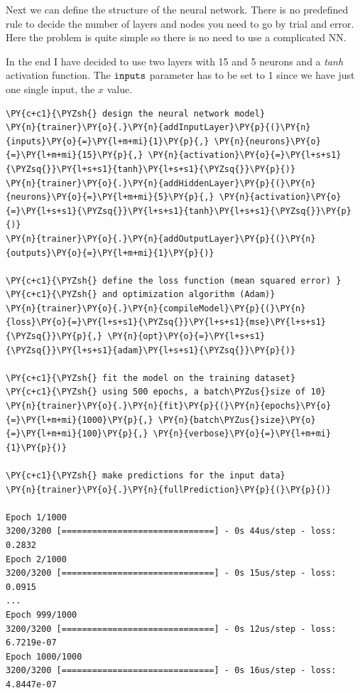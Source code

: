Next we can define the structure of the neural network. There is no
predefined rule to decide the number of layers and nodes you need to go
by trial and error. Here the problem is quite simple so there is no need
to use a complicated NN.

In the end I have decided to use two layers with 15 and 5 neurons and a
\emph{tanh} activation function. The \(\tt{inputs}\) parameter has to be
set to 1 since we have just one single input, the \(x\) value.

\begin{tcolorbox}[breakable, size=fbox, boxrule=1pt, pad at break*=1mm,colback=cellbackground, colframe=cellborder]
\begin{Verbatim}[commandchars=\\\{\}]
\PY{c+c1}{\PYZsh{} design the neural network model}
\PY{n}{trainer}\PY{o}{.}\PY{n}{addInputLayer}\PY{p}{(}\PY{n}{inputs}\PY{o}{=}\PY{l+m+mi}{1}\PY{p}{,} \PY{n}{neurons}\PY{o}{=}\PY{l+m+mi}{15}\PY{p}{,} \PY{n}{activation}\PY{o}{=}\PY{l+s+s1}{\PYZsq{}}\PY{l+s+s1}{tanh}\PY{l+s+s1}{\PYZsq{}}\PY{p}{)}
\PY{n}{trainer}\PY{o}{.}\PY{n}{addHiddenLayer}\PY{p}{(}\PY{n}{neurons}\PY{o}{=}\PY{l+m+mi}{5}\PY{p}{,} \PY{n}{activation}\PY{o}{=}\PY{l+s+s1}{\PYZsq{}}\PY{l+s+s1}{tanh}\PY{l+s+s1}{\PYZsq{}}\PY{p}{)}
\PY{n}{trainer}\PY{o}{.}\PY{n}{addOutputLayer}\PY{p}{(}\PY{n}{outputs}\PY{o}{=}\PY{l+m+mi}{1}\PY{p}{)}
	
\PY{c+c1}{\PYZsh{} define the loss function (mean squared error) }
\PY{c+c1}{\PYZsh{} and optimization algorithm (Adam)}
\PY{n}{trainer}\PY{o}{.}\PY{n}{compileModel}\PY{p}{(}\PY{n}{loss}\PY{o}{=}\PY{l+s+s1}{\PYZsq{}}\PY{l+s+s1}{mse}\PY{l+s+s1}{\PYZsq{}}\PY{p}{,} \PY{n}{opt}\PY{o}{=}\PY{l+s+s1}{\PYZsq{}}\PY{l+s+s1}{adam}\PY{l+s+s1}{\PYZsq{}}\PY{p}{)}
	
\PY{c+c1}{\PYZsh{} fit the model on the training dataset}
\PY{c+c1}{\PYZsh{} using 500 epochs, a batch\PYZus{}size of 10}
\PY{n}{trainer}\PY{o}{.}\PY{n}{fit}\PY{p}{(}\PY{n}{epochs}\PY{o}{=}\PY{l+m+mi}{1000}\PY{p}{,} \PY{n}{batch\PYZus{}size}\PY{o}{=}\PY{l+m+mi}{100}\PY{p}{,} \PY{n}{verbose}\PY{o}{=}\PY{l+m+mi}{1}\PY{p}{)}
	
\PY{c+c1}{\PYZsh{} make predictions for the input data}
\PY{n}{trainer}\PY{o}{.}\PY{n}{fullPrediction}\PY{p}{(}\PY{p}{)}
	
Epoch 1/1000
3200/3200 [==============================] - 0s 44us/step - loss: 0.2832
Epoch 2/1000
3200/3200 [==============================] - 0s 15us/step - loss: 0.0915
...
Epoch 999/1000
3200/3200 [==============================] - 0s 12us/step - loss: 6.7219e-07
Epoch 1000/1000
3200/3200 [==============================] - 0s 16us/step - loss: 4.8447e-07
\end{Verbatim}
\end{tcolorbox}

